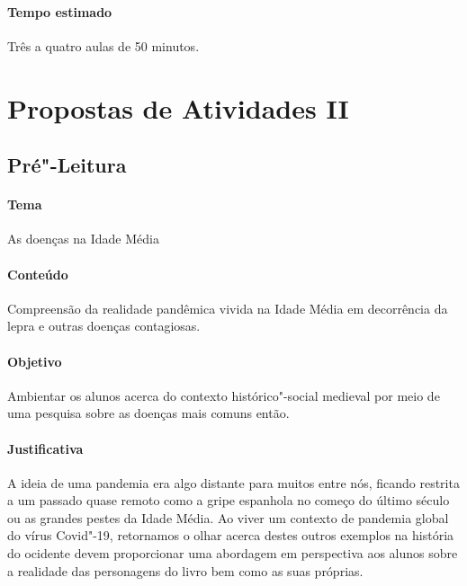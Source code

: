 \documentclass[12pt]{extarticle}
\begin{document}
 \paragraph{Tempo estimado} Três a quatro aulas de 50 minutos. 


\section{Propostas de Atividades II}

\subsection{Pré"-Leitura}

 \paragraph{Tema} As doenças na Idade Média

 \paragraph{Conteúdo} Compreensão da realidade pandêmica vivida na Idade
 Média em decorrência da lepra e outras doenças contagiosas.

 \paragraph{Objetivo} Ambientar os alunos acerca do contexto histórico"-social 
 medieval por meio de uma pesquisa sobre as doenças mais comuns então.

 \paragraph{Justificativa} A ideia de uma pandemia era algo distante para
 muitos entre nós, ficando restrita a um passado quase remoto como a gripe
 espanhola no começo do último século ou as grandes pestes da Idade Média. 
 Ao viver um contexto de pandemia global do vírus Covid"-19, retornamos o
 olhar acerca destes outros exemplos na história do ocidente devem proporcionar 
 uma abordagem em perspectiva aos alunos sobre a realidade das personagens 
 do livro bem como as suas próprias.
\end{document}

